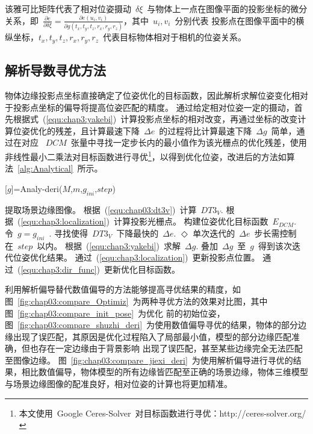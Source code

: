 该雅可比矩阵代表了相对位姿摄动~$\delta \xi$~与物体上一点在图像平面的投影坐标的微分关系，即~$\frac{\partial e}{\partial \delta \xi}=\frac{\partial e(u_i,v_i)}{\partial g(t_x,t_y,t_z,r_x,r_y,r_z)}$，其中~$u_i,v_i$~分别代表
投影点在图像平面中的横纵坐标，$t_x,t_y,t_z,r_x,r_y,r_z$~代表目标物体相对于相机的位姿关系。
\subsection{解析导数寻优方法}
\label{sec:Analytic derivative optimization}
物体边缘投影点坐标直接确定了位姿优化的目标函数，因此解析求解位姿变化相对于投影点坐标的偏导将提高位姿匹配的精度。
通过给定相对位姿一定的摄动，首先根据式~(\ref{equ:chap3:yakebi})~计算投影点坐标的相对改变，再通过坐标的改变计算位姿优化的残差，且计算最速下降~$\Delta e$~的过程将比计算最速下降~$\Delta g$~简单，通过在对应
~$DCM$~张量中寻找一定步长内的最小值作为该光栅点的优化残差，使用非线性最小二乘法对目标函数进行寻优\footnote{本文使用~Google Ceres-Solver~对目标函数进行寻优：http://ceres-solver.org/}，以得到优化位姿，改进后的方法如算法~\ref{alg:Analytical}~所示。
\begin{algorithm}[H]
  \caption{[$g$]=Analy-deri($M$,$m$,$g_{ini}$,$step$)}
  \label{alg:Analytical}
  \begin{algorithmic}[1]
    \State 提取场景边缘图像。
    \State 根据~(\ref{equ:chap03:dt3v})~计算~$DT3_V$.
    \State 根据~(\ref{equ:chap3:localization})~计算投影光栅点。
    \State 构建位姿优化目标函数~$E_{DCM}$.
    \State 令~$g=g_{ini}$~.
    \Repeat
    \State 寻找使得~$DT3_V$~下降最快的~$\Delta e$.
    \Statex \hspace{0.5cm} $\Diamond$ 单次迭代的~$\Delta e$~步长需控制在~$step$~以内。
    \State 根据~(\ref{equ:chap3:yakebi})~求解~$\Delta g$.
    \State 叠加~$\Delta g$~至~$g$~得到该次迭代位姿优化结果。
    \State 通过~(\ref{equ:chap3:localization})~更新投影点位置。
    \State 通过~(\ref{equ:chap3:dir_func})~更新优化目标函数。
    \\
  \end{algorithmic}
\end{algorithm}
\vspace{6pt} 

利用解析偏导替代数值偏导的方法能够提高寻优结果的精度，如图~\ref{fig:chap03:compare_Optimiz}~为两种寻优方法的效果对比图，其中图~\ref{fig:chap03:compare_init_pose}~为优化
前的初始位姿，图~\ref{fig:chap03:compare_shuzhi_deri}~为使用数值偏导寻优的结果，物体的部分边缘出现了误匹配，其原因是优化过程陷入了局部最小值，模型的部分边缘匹配准确，但也存在一定边缘由于背景影响
出现了误匹配，甚至某些边缘完全无法匹配至图像边缘。
图~\ref{fig:chap03:compare_jiexi_deri}~为使用解析偏导进行寻优的结果，相比数值偏导，物体模型的所有边缘皆匹配至正确的场景边缘，物体三维模型与场景边缘图像的配准良好，相对位姿的计算也将更加精准。

